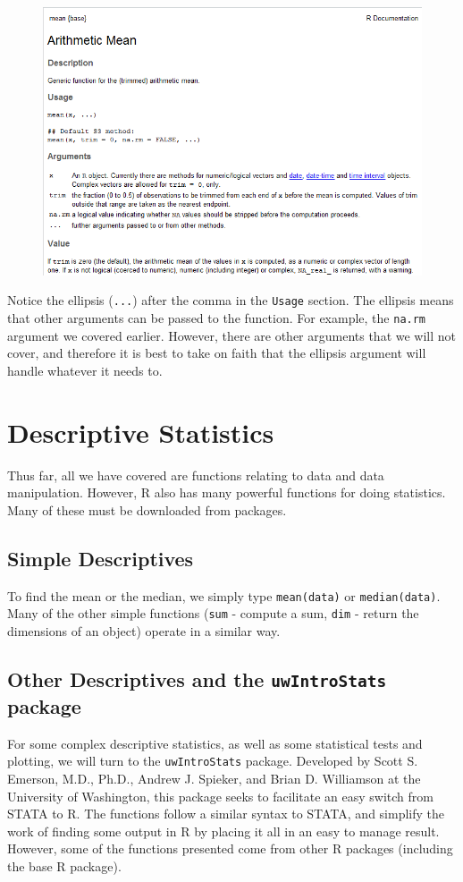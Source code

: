 \documentclass[11pt,letterpaper,fleqn]{report}
\begin{document}
\begin{figure}[h!]
\centering
\includegraphics[width = 5in]{mean_help.png}
\end{figure}

Notice the ellipsis (\texttt{...}) after the comma in the \texttt{Usage} section. The ellipsis means that other arguments can be passed to the function. For example, the \texttt{na.rm} argument we covered earlier. However, there are other arguments that we will not cover, and therefore it is best to take on faith that the ellipsis argument will handle whatever it needs to.
\chapter{Descriptive Statistics}
Thus far, all we have covered are functions relating to data and data manipulation. However, R also has many powerful functions for doing statistics. Many of these must be downloaded from packages.
\section{Simple Descriptives}
To find the mean or the median, we simply type \texttt{mean(data)} or \texttt{median(data)}. Many of the other simple functions (\texttt{sum} - compute a sum, \texttt{dim} - return the dimensions of an object) operate in a similar way. 
\section{Other Descriptives and the \texttt{uwIntroStats} package}
For some complex descriptive statistics, as well as some statistical tests and plotting, we will turn to the \texttt{uwIntroStats} package. Developed by Scott S. Emerson, M.D., Ph.D., Andrew J. Spieker, and Brian D. Williamson at the University of Washington, this package seeks to facilitate an easy switch from STATA to R. The functions follow a similar syntax to STATA, and simplify the work of finding some output in R by placing it all in an easy to manage result. However, some of the functions presented come from other R packages (including the base R package).
\end{document}
